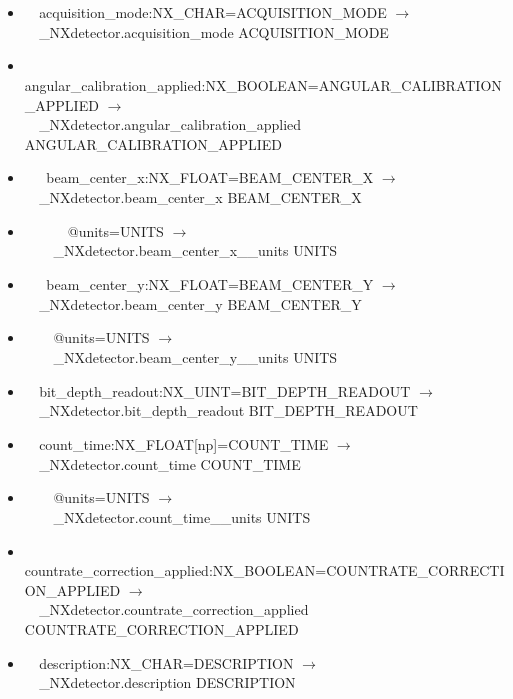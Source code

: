 \documentclass[11pt]{article}
\begin{document}
{{\begin{itemize}
\item{\verb|  |acquisition\_mode:NX\_CHAR=ACQUISITION\_MODE $\rightarrow$\\
\verb|  |\_NXdetector.acquisition\_mode ACQUISITION\_MODE}

\item{\verb|  |angular\_calibration\_applied:NX\_BOOLEAN=ANGULAR\_CALIBRATION\_APPLIED $\rightarrow$\\
\verb|  |\_NXdetector.angular\_calibration\_applied ANGULAR\_CALIBRATION\_APPLIED}

\item{\verb|   |beam\_center\_x:NX\_FLOAT=BEAM\_CENTER\_X $\rightarrow$\\
\verb|  |\_NXdetector.beam\_center\_x BEAM\_CENTER\_X}

\item{\verb|      |@units=UNITS $\rightarrow$\\
\verb|    |\_NXdetector.beam\_center\_x\_\_units UNITS}

\item{\verb|   |beam\_center\_y:NX\_FLOAT=BEAM\_CENTER\_Y $\rightarrow$\\
\verb|  |\_NXdetector.beam\_center\_y BEAM\_CENTER\_Y}

\item{\verb|    |@units=UNITS $\rightarrow$\\
\verb|    |\_NXdetector.beam\_center\_y\_\_units UNITS}

\item{\verb|  |bit\_depth\_readout:NX\_UINT=BIT\_DEPTH\_READOUT $\rightarrow$\\
\verb|  |\_NXdetector.bit\_depth\_readout BIT\_DEPTH\_READOUT}

\item{\verb|  |count\_time:NX\_FLOAT[np]=COUNT\_TIME $\rightarrow$\\
\verb|  |\_NXdetector.count\_time COUNT\_TIME}

\item{\verb|    |@units=UNITS $\rightarrow$\\
\verb|    |\_NXdetector.count\_time\_\_units UNITS}

\item{\verb|  |countrate\_correction\_applied:NX\_BOOLEAN=COUNTRATE\_CORRECTION\_APPLIED $\rightarrow$\\
\verb|  |\_NXdetector.countrate\_correction\_applied COUNTRATE\_CORRECTION\_APPLIED}

\item{\verb|  |description:NX\_CHAR=DESCRIPTION $\rightarrow$\\
\verb|  |\_NXdetector.description DESCRIPTION}


\end{itemize}}}
\end{document}
